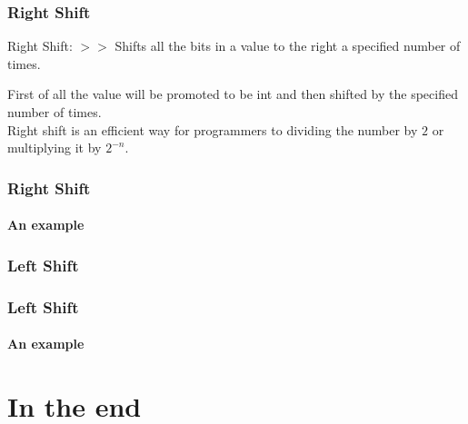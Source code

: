 \documentclass[table, compress]{beamer}
\begin{document}
\begin{frame}
    \frametitle{Right Shift}
    \begin{block}{Right Shift: $>>$}
    	Shifts all the bits in a value to the right a specified number of times.
    \end{block}
    First of all the value will be promoted to be int and then shifted by the specified number of times.\\
    Right shift is an efficient way for programmers to dividing the number by $2$ or multiplying it by $2^{-n}$.

\end{frame}


\begin{frame}
    \frametitle{Right Shift}
    \framesubtitle{An example}
%    

\end{frame}


\begin{frame}
    \frametitle{Left Shift}

\end{frame}


\begin{frame}
    \frametitle{Left Shift}
    \framesubtitle{An example}

\end{frame}


\section{In the end}
\end{document}
